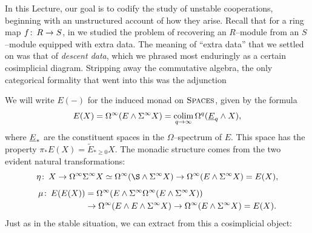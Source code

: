 In this Lecture, our goal is to codify the study of unstable cooperations, beginning with an unstructured account of how they arise.
Recall that for a ring map \(f\colon\thinspace R \to S\), in  we studied the problem of recovering an \(R\)--module from an \(S\)--module equipped with extra data.
The meaning of ``extra data'' that we settled on was that of \textit{descent data}, which we phrased most enduringly as a certain cosimplicial diagram.
Stripping away the commutative algebra, the only categorical formality that went into this was the adjunction
\begin{center}
\end{center}
We will write \(E(-)\) for the induced monad on \(\normalfont\textsc{Spaces}\), given by the formula \[E(X) = \Loops^\infty (E \sm \Susp^\infty X) = \colim_{q \to \infty} \Loops^q (\OS{E}{q} \sm X),\] where \(\OS{E}{*}\) are the constituent spaces in the \(\Omega\)--spectrum of \(E\).
This space has the property \(\pi_* E(X) = \widetilde E_{* \ge 0} X\).
The monadic structure comes from the two evident natural transformations:
\[\eta\co X \to \Loops^\infty \Susp^\infty X \simeq \Loops^\infty (\S \sm \Susp^\infty X) \to \Loops^\infty (E \sm \Susp^\infty X) = E(X),\] \vspace{-1.6\baselineskip}
\begin{align*}
\mu\colon\thinspace E(E(X)) & = \Omega^\infty(E \wedge \Sigma^\infty\Omega^\infty(E \wedge \Sigma^\infty X)) \\
& \to \Omega^\infty(E \wedge E \wedge \Sigma^\infty X) \to \Omega^\infty(E \wedge \Sigma^\infty X) = E(X).
\end{align*}
Just as in the stable situation, we can extract from this a cosimplicial object:

